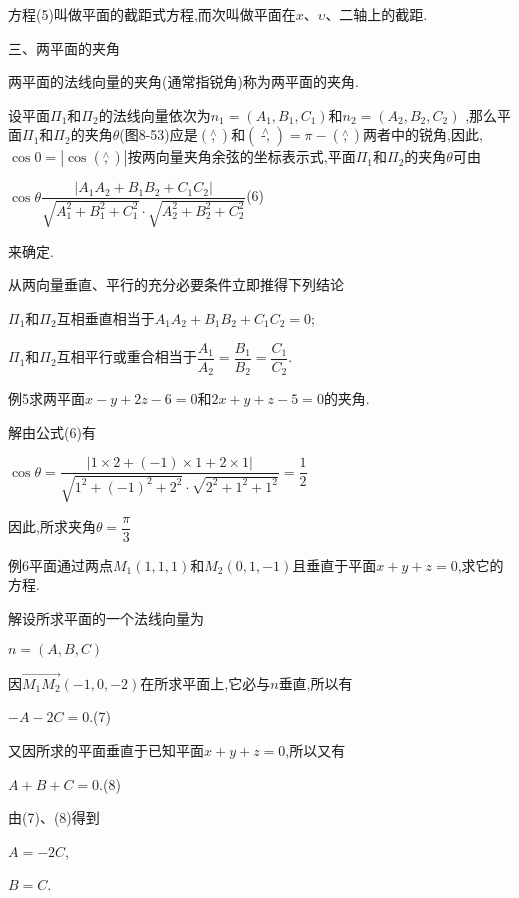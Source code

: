 \documentclass[oneside]{book}
\begin{document}
方程(5)叫做平面的截距式方程,而次叫做平面在$x$、$υ$、二轴上的截距.

三、两平面的夹角

两平面的法线向量的夹角(通常指锐角)称为两平面的夹角.

设平面${\Pi _1}$和${\Pi _2}$的法线向量依次为${n_1} = ({A_1},{B_1},{C_1})$和${n_2} = ({A_2},{B_2},{C_2})$
,那么平面${\Pi _1}$和${\Pi _2}$的夹角$\theta $(图8-53)应是$\left( {\mathop {{n_1},{n_2}}\limits^ \wedge  } \right)$和$\left( {\mathop { - {n_1},{n_2}}\limits^ \wedge  } \right) = \pi  - \left( {\mathop {{n_1},{n_2}}\limits^ \wedge  } \right)$两者中的锐角,因此,${{\cos}}0 = |{{\cos}}(\mathop {{n_1},{n_2}}\limits^ \wedge  )|$按两向量夹角余弦的坐标表示式,平面${\Pi _1}$和${\Pi _2}$的夹角$\theta $可由

$\cos \theta \dfrac{{|{A_1}{A_2} + {B_1}{B_2} + {C_1}{C_2}|}}{{\sqrt {A_1^2 + B_1^2 + C_1^2}  \cdot \sqrt {A_2^2 + B_2^2 + C_2^2} }}$\quad (6)

来确定.

从两向量垂直、平行的充分必要条件立即推得下列结论

${\Pi _1}$和${\Pi _2}$互相垂直相当于${A_1}{A_2} + {B_1}{B_2} + {C_1}{C_2} = 0$;

${\Pi _1}$和${\Pi _2}$互相平行或重合相当于$\dfrac{{{A_1}}}{{{A_2}}} = \dfrac{{B_1}}{{{B_2}}} = \dfrac{{{C_1}}}{{{C_2}}}$.

例5求两平面$x - y + 2z - 6 = 0$和$2x + y + z - 5 = 0$的夹角.

解由公式(6)有

$\cos \theta  = \dfrac{{|1 \times 2 + ( - 1) \times 1 + 2 \times 1|}}{{\sqrt {{1^2} + {{\left( { - 1} \right)}^2} + {2^2}}  \cdot \sqrt {{2^2} + {1^2} + {1^2}} }} = \dfrac{1}{2}$

因此,所求夹角$\theta  = \dfrac{\pi }{3}$

例6平面通过两点${M_1}\left( {1,1,1} \right)$和${M_2}\left( {0,1, - 1} \right)$且垂直于平面$x + y + z = 0$,求它的方程.

解设所求平面的一个法线向量为

$n=(A, B,C)$

因$\overrightarrow {{M_1}{M_2}} ( - 1,0, - 2)$在所求平面上,它必与$n$垂直,所以有

$ - A - 2C = 0$.(7)

又因所求的平面垂直于已知平面$x + y + z = 0$,所以又有

$A + B + C = 0$.(8)

由(7)、(8)得到

$A=-2 C$,

$B=C$.
\end{document}
